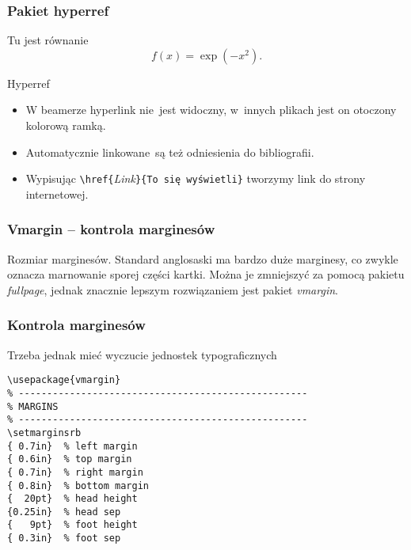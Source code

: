 \documentclass[10pt,t]{beamer}
\begin{document}
\begin{frame}[fragile]
  \frametitle{Pakiet hyperref}


  Tu jest równanie
  \begin{equation}
    \label{eq:Jak-pisac-01}
    f( x ) = \exp( -x^{ 2 } ).
  \end{equation}

  Hyperref
  \begin{itemize}
    \RaggedRight

  \item W beamerze hyperlink nie~jest widoczny, w~innych plikach
    jest on otoczony kolorową ramką.

  \item Automatycznie linkowane~są też odniesienia do bibliografii.

  \item Wypisując \verb+\href{+\textit{Link}\verb+}{To się wyświetli}+
    tworzymy link do strony internetowej.

  \end{itemize}





\end{frame}






\begin{frame}
  \frametitle{Vmargin -- kontrola marginesów}


  Rozmiar marginesów. Standard anglosaski ma bardzo duże marginesy, co
  zwykle oznacza marnowanie sporej części kartki. Można je zmniejszyć za
  pomocą pakietu \textit{fullpage}, jednak znacznie lepszym rozwiązaniem
  jest pakiet \textit{vmargin}.

\end{frame}





\begin{frame}[fragile]
  \frametitle{Kontrola marginesów}


  Trzeba jednak mieć wyczucie jednostek typograficznych
\begin{verbatim}
\usepackage{vmargin}
% ---------------------------------------------------
% MARGINS
% ---------------------------------------------------
\setmarginsrb
{ 0.7in}  % left margin
{ 0.6in}  % top margin
{ 0.7in}  % right margin
{ 0.8in}  % bottom margin
{  20pt}  % head height
{0.25in}  % head sep
{   9pt}  % foot height
{ 0.3in}  % foot sep
\end{verbatim}

\end{frame}
\end{document}
